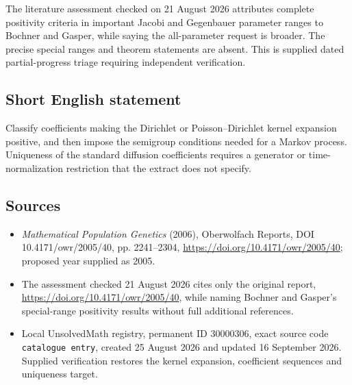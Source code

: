 \documentclass[11pt]{article}
\begin{document}
The literature assessment checked on 21 August 2026 attributes complete positivity criteria in important Jacobi and Gegenbauer parameter ranges to Bochner and Gasper, while saying the all-parameter request is broader. The precise special ranges and theorem statements are absent. This is supplied dated partial-progress triage requiring independent verification.
\subsection{Short English statement}
Classify coefficients making the Dirichlet or Poisson--Dirichlet kernel expansion positive, and then impose the semigroup conditions needed for a Markov process. Uniqueness of the standard diffusion coefficients requires a generator or time-normalization restriction that the extract does not specify.
\subsection{Sources}
\begin{itemize}
\item \emph{Mathematical Population Genetics} (2006), Oberwolfach Reports, DOI 10.4171/owr/2005/40, pp. 2241--2304, \url{https://doi.org/10.4171/owr/2005/40}; proposed year supplied as 2005.
\item The assessment checked 21 August 2026 cites only the original report, \url{https://doi.org/10.4171/owr/2005/40}, while naming Bochner and Gasper's special-range positivity results without full additional references.
\item Local UnsolvedMath registry, permanent ID $30000306$, exact source code \texttt{catalogue entry}, created 25 August 2026 and updated 16 September 2026. Supplied verification restores the kernel expansion, coefficient sequences and uniqueness target.
\end{itemize}
\end{document}
